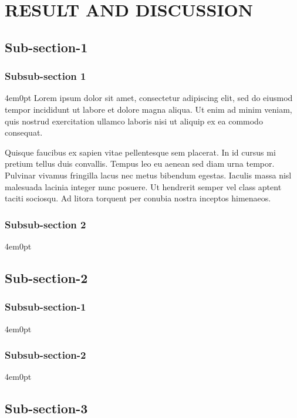\renewcommand{\thechapter}{\Roman{chapter}}
\chapter[]{RESULT AND DISCUSSION}
\renewcommand{\thechapter}{\arabic{chapter}}
\begingroup
\fontsize{12pt}{\baselineskip}\selectfont
\section{Sub-section-1}

\subsection{Subsub-section 1}
\begin{indentedblock}{4em}{0pt}
	Lorem ipsum dolor sit amet, consectetur adipiscing elit, sed do eiusmod tempor incididunt ut labore et dolore magna aliqua. Ut enim ad minim veniam, quis nostrud exercitation ullamco laboris nisi ut aliquip ex ea commodo consequat. 
	
	
	Quisque faucibus ex sapien vitae pellentesque sem placerat. In id cursus mi pretium tellus duis convallis. Tempus leo eu aenean sed diam urna tempor. Pulvinar vivamus fringilla lacus nec metus bibendum egestas. Iaculis massa nisl malesuada lacinia integer nunc posuere. Ut hendrerit semper vel class aptent taciti sociosqu. Ad litora torquent per conubia nostra inceptos himenaeos.
\end{indentedblock}
\subsection{Subsub-section 2}
\begin{indentedblock}{4em}{0pt}
\end{indentedblock}
\section{Sub-section-2}

\subsection{Subsub-section-1}
\begin{indentedblock}{4em}{0pt}
\end{indentedblock}
\subsection{Subsub-section-2}
\begin{indentedblock}{4em}{0pt}
\end{indentedblock}

\section{Sub-section-3}
\endgroup